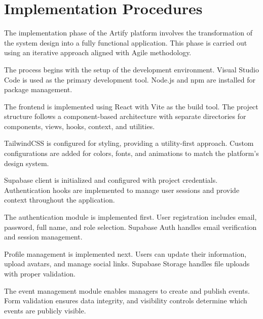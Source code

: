 \documentclass[12pt,a4paper]{report}
\begin{document}
\setcounter{chapter}{6}
\clearpage
\thispagestyle{empty}

\noindent
{}

\clearpage
{}
\setcounter{section}{0}

\section{Implementation Procedures}

The implementation phase of the Artify platform involves the transformation of the system design into a fully functional application. This phase is carried out using an iterative approach aligned with Agile methodology.

The process begins with the setup of the development environment. Visual Studio Code is used as the primary development tool. Node.js and npm are installed for package management.

The frontend is implemented using React with Vite as the build tool. The project structure follows a component-based architecture with separate directories for components, views, hooks, context, and utilities.

TailwindCSS is configured for styling, providing a utility-first approach. Custom configurations are added for colors, fonts, and animations to match the platform's design system.

Supabase client is initialized and configured with project credentials. Authentication hooks are implemented to manage user sessions and provide context throughout the application.

The authentication module is implemented first. User registration includes email, password, full name, and role selection. Supabase Auth handles email verification and session management.

Profile management is implemented next. Users can update their information, upload avatars, and manage social links. Supabase Storage handles file uploads with proper validation.

The event management module enables managers to create and publish events. Form validation ensures data integrity, and visibility controls determine which events are publicly visible.
\end{document}
